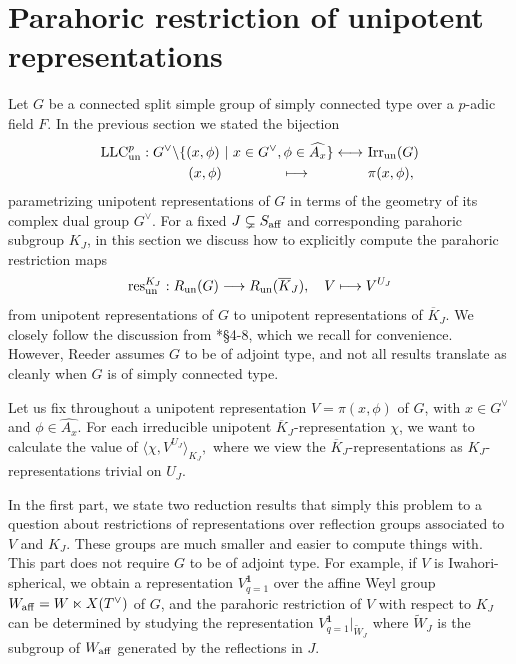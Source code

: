 \section{Parahoric restriction of unipotent representations}\label{sec:parahoric_restriction}

Let $G$ be a connected split simple group of simply connected type over a $p$-adic field $F$. In the previous section we stated the bijection
\begin{align*}
    \mathrm{LLC}^p_{\mathrm{un}}: G^\vee\backslash\{(x,\phi)\ |\ x\in G^\vee, \phi\in\widehat{A_x}\}\longleftrightarrow\ &\mathrm{Irr}_{\mathrm{un}}(G)\\
    (x,\phi)\hspace{1.5cm}\longmapsto \hspace{1.5cm}&\pi(x,\phi),
\end{align*}
parametrizing unipotent representations of $G$ in terms of the geometry of its complex dual group $G^\vee$. For a fixed $J\subsetneq S_{\mathrm{aff}}$ and corresponding parahoric subgroup $K_J$, in this section we discuss how to explicitly compute the parahoric restriction maps 
\[
    \mathrm{res}_{\mathrm{un}}^{K_J}:R_{\mathrm{un}}(G)\longrightarrow R_{\mathrm{un}}(\overline{K}_J), \quad V\longmapsto V^{U_J}
\]
from unipotent representations of $G$ to unipotent representations of $\overline{K}_J$. %
We closely follow the discussion from \cite{Reeder2000}*{\S4-8}, which we recall for convenience. However, Reeder assumes $G$ to be of adjoint type, and not all results translate as cleanly when $G$ is of simply connected type.

Let us fix throughout a unipotent representation $V=\pi(x,\phi)$ of $G$, with $x\in G^\vee$ and $\phi\in\widehat{A_x}$. 
For each irreducible unipotent $\overline{K}_J$-representation $\chi$, we want to calculate the value of 
$\langle\chi,V^{U_J}\rangle_{K_J},$
where we view the $\overline{K}_J$-representations as $K_J$-representations trivial on $U_J$.


In the first part, we state two reduction results that simply this problem to a question about restrictions of representations over reflection groups associated to $V$ and $K_J$. These groups are much smaller and easier to compute things with. This part does not require $G$ to be of adjoint type. For example, if $V$ is Iwahori-spherical, we obtain a representation $V^{\mathbf{1}}_{q=1}$ over the affine Weyl group $W_{\mathrm{aff}}=W\ltimes X(T^\vee)$ of $G$, and the parahoric restriction of $V$ with respect to $K_J$ can be determined by studying the representation $V^{\mathbf{1}}_{q=1}|_{\widetilde{W}_J}$ where $\widetilde{W}_J$ is the subgroup of $W_{\mathrm{aff}}$ generated by the reflections in $J$. 

